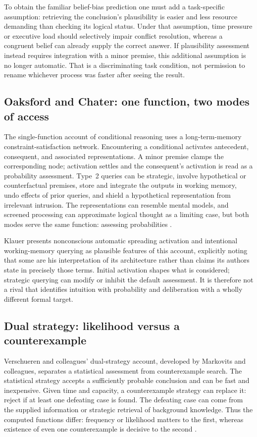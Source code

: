 To obtain the familiar belief-bias prediction one must add a task-specific
assumption: retrieving the conclusion's plausibility is easier and less
resource demanding than checking its logical status. Under that assumption,
time pressure or executive load should selectively impair conflict
resolution, whereas a congruent belief can already supply the correct
answer. If plausibility assessment instead requires integration with a
minor premise, this additional assumption is no longer automatic. That
is a discriminating task condition, not permission to rename whichever
process was faster after seeing the result.

\subsection{Oaksford and Chater: one function, two modes of access}

The single-function account of conditional reasoning uses a long-term-memory
constraint-satisfaction network. Encountering a conditional activates
antecedent, consequent, and associated representations. A minor premise
clamps the corresponding node; activation settles and the consequent's
activation is read as a probability assessment. Type~2 queries can be
strategic, involve hypothetical or counterfactual premises, store and
integrate the outputs in working memory, undo effects of prior queries,
and shield a hypothetical representation from irrelevant intrusion.
The representations can resemble mental models, and screened processing
can approximate logical thought as a limiting case, but both modes serve
the same function: assessing probabilities
\cite[pp.~176--177]{Klauer2021DualProcess}.

Klauer presents nonconscious automatic spreading activation and intentional
working-memory querying as plausible features of this account, explicitly
noting that some are his interpretation of its architecture rather than
claims its authors state in precisely those terms. Initial activation
shapes what is considered; strategic querying can modify or inhibit the
default assessment. It is therefore not a rival that identifies intuition
with probability and deliberation with a wholly different formal target.

\subsection{Dual strategy: likelihood versus a counterexample}

Verschueren and colleagues' dual-strategy account, developed by Markovits
and colleagues, separates a statistical assessment from counterexample
search. The statistical strategy accepts a sufficiently probable conclusion
and can be fast and inexpensive. Given time and capacity, a counterexample
strategy can replace it: reject if at least one defeating case is found.
The defeating case can come from the supplied information or strategic
retrieval of background knowledge. Thus the computed functions differ:
frequency or likelihood matters to the first, whereas existence of even
one counterexample is decisive to the second
\cite[p.~177]{Klauer2021DualProcess}.


